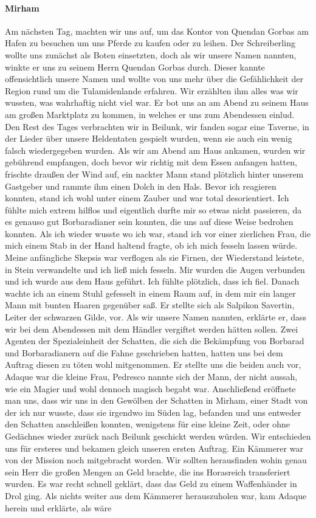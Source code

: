 \paragraph{Mirham}
Am nächsten Tag, machten wir uns auf, um das Kontor von Quendan Gorbas am Hafen zu besuchen um uns Pferde zu kaufen oder zu leihen. Der Schreiberling wollte uns zunächst als Boten einsetzten, doch als wir unsere Namen nannten, winkte er uns zu seinem Herrn Quendan Gorbas durch. Dieser kannte offensichtlich unsere Namen und wollte von uns mehr über die Gefählichkeit der Region rund um die Tulamidenlande erfahren. Wir erzählten ihm alles was wir wussten, was wahrhaftig nicht viel war. Er bot uns an am Abend zu seinem Haus am großen Marktplatz zu kommen, in welches er uns zum Abendessen einlud. Den Rest des Tages verbrachten wir in Beilunk, wir fanden sogar eine Taverne, in der Lieder über unsere Heldentaten gespielt wurden, wenn sie auch ein wenig falsch wiedergegeben wurden. Als wir am Abend am Haus ankamen, wurden wir gebührend empfangen, doch bevor wir richtig mit dem Essen anfangen hatten, frischte draußen der Wind auf, ein nackter Mann stand plötzlich hinter unserem Gastgeber und rammte ihm einen Dolch in den Hals. Bevor ich reagieren konnten, stand ich wohl unter einem Zauber und war total desorientiert. Ich fühlte mich extrem hilflos und eigentlich durfte mir so etwas nicht passieren, da es genauso gut Borbaradianer sein konnten, die uns auf diese Weise bedrohen konnten. Als ich wieder wusste wo ich war, stand ich vor einer zierlichen Frau, die mich einem Stab in der Hand haltend fragte, ob ich mich fesseln lassen würde. Meine anfängliche Skepsis war verflogen als sie Firnen, der Wiederstand leistete, in Stein verwandelte und ich ließ mich fesseln. Mir wurden die Augen verbunden und ich wurde aus dem Haus geführt. Ich fühlte plötzlich, dass ich fiel. Danach wachte ich an einem Stuhl gefesselt in einem Raum auf, in dem mir ein langer Mann mit bunten Haaren gegenüber saß. Er stellte sich als Salpikon Savertin, Leiter der schwarzen Gilde, vor. Als wir unsere Namen nannten, erklärte er, dass wir bei dem Abendessen mit dem Händler vergiftet werden hätten sollen. Zwei Agenten der Spezialeinheit der Schatten, die sich die Bekämpfung von Borbarad und Borbaradianern auf die Fahne geschrieben hatten, hatten uns bei dem Auftrag diesen zu töten wohl mitgenommen. Er stellte uns die beiden auch vor, Adaque war die kleine Frau, Pedresco nannte sich der Mann, der nicht aussah, wie ein Magier und wohl dennoch magisch begabt war. Anschließend eröffnete man uns, dass wir uns in den Gewölben der Schatten in Mirham, einer Stadt von der ich nur wusste, dass sie irgendwo im Süden lag, befanden und uns entweder den Schatten anschleißen konnten, wenigstens für eine kleine Zeit, oder ohne Gedächnes wieder zurück nach Beilunk geschickt werden würden. Wir entschieden uns für ersteres und bekamen gleich unseren ersten Auftrag. Ein Kämmerer war von der Mission noch mitgebracht worden. Wir sollten herausfinden wohin genau sein Herr die großen Mengen an Geld brachte, die ins Horasreich transferiert wurden. Es war recht schnell geklärt, dass das Geld zu einem Waffenhänder in Drol ging. Als nichts weiter aus dem Kämmerer herauszuholen war, kam Adaque herein und erklärte, als wäre 